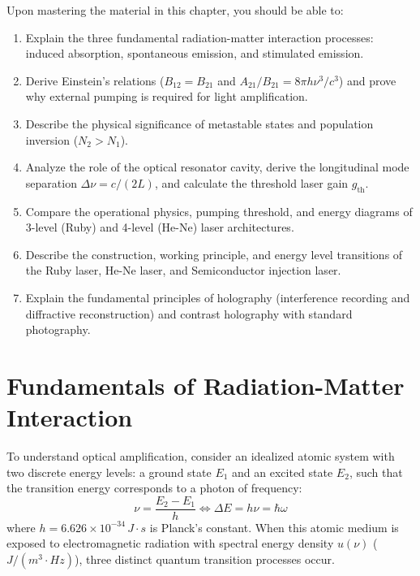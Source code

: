 \begin{important}
Upon mastering the material in this chapter, you should be able to:
\begin{enumerate}
    \item Explain the three fundamental radiation-matter interaction processes: induced absorption, spontaneous emission, and stimulated emission.
    \item Derive Einstein's relations ($B_{12} = B_{21}$ and $A_{21}/B_{21} = 8\pi h \nu^3/c^3$) and prove why external pumping is required for light amplification.
    \item Describe the physical significance of metastable states and population inversion ($N_2 > N_1$).
    \item Analyze the role of the optical resonator cavity, derive the longitudinal mode separation $\Delta \nu = c/(2L)$, and calculate the threshold laser gain $g_{\text{th}}$.
    \item Compare the operational physics, pumping threshold, and energy diagrams of 3-level (Ruby) and 4-level (He-Ne) laser architectures.
    \item Describe the construction, working principle, and energy level transitions of the Ruby laser, He-Ne laser, and Semiconductor injection laser.
    \item Explain the fundamental principles of holography (interference recording and diffractive reconstruction) and contrast holography with standard photography.
\end{enumerate}
\end{important}

\section{Fundamentals of Radiation-Matter Interaction}

To understand optical amplification, consider an idealized atomic system with two discrete energy levels: a ground state $E_1$ and an excited state $E_2$, such that the transition energy corresponds to a photon of frequency:
\begin{equation}
    \nu = \frac{E_2 - E_1}{h} \iff \Delta E = h\nu = \hbar\omega
\end{equation}
where $h = 6.626 \times 10^{-34}\,\si{J\cdot s}$ is Planck's constant. When this atomic medium is exposed to electromagnetic radiation with spectral energy density $u(\nu)$ ($\si{J/(m^3\cdot Hz)}$), three distinct quantum transition processes occur.

